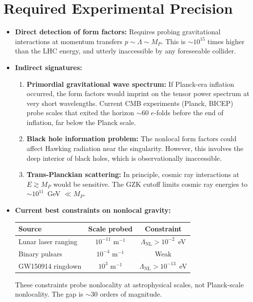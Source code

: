 \documentclass[11pt,a4paper]{article}
\begin{document}
\section{Required Experimental Precision}

\begin{itemize}[leftmargin=2em]
  \item \textbf{Direct detection of form factors:} Requires probing gravitational interactions at momentum transfers $p \sim \Lambda \sim M_P$. This is $\sim 10^{15}$ times higher than the LHC energy, and utterly inaccessible by any foreseeable collider.

  \item \textbf{Indirect signatures:}
    \begin{enumerate}
      \item \textbf{Primordial gravitational wave spectrum:} If Planck-era inflation occurred, the form factors would imprint on the tensor power spectrum at very short wavelengths. Current CMB experiments (Planck, BICEP) probe scales that exited the horizon $\sim 60$ $e$-folds before the end of inflation, far below the Planck scale.
      \item \textbf{Black hole information problem:} The nonlocal form factors could affect Hawking radiation near the singularity. However, this involves the deep interior of black holes, which is observationally inaccessible.
      \item \textbf{Trans-Planckian scattering:} In principle, cosmic ray interactions at $E \gtrsim M_P$ would be sensitive. The GZK cutoff limits cosmic ray energies to $\sim 10^{11}$~GeV $\ll M_P$.
    \end{enumerate}

  \item \textbf{Current best constraints on nonlocal gravity:}
    \begin{center}
    \renewcommand{\arraystretch}{1.2}
    \begin{tabular}{lcc}
      \toprule
      \textbf{Source} & \textbf{Scale probed} & \textbf{Constraint} \\
      \midrule
      Lunar laser ranging & $10^{-11}$ m$^{-1}$ & $\Lambda_{\text{NL}} > 10^{-2}$~eV \\
      Binary pulsars & $10^{-4}$ m$^{-1}$ & Weak \\
      GW150914 ringdown & $10^{3}$ m$^{-1}$ & $\Lambda_{\text{NL}} > 10^{-13}$~eV \\
      \bottomrule
    \end{tabular}
    \end{center}
    These constraints probe nonlocality at astrophysical scales, not Planck-scale nonlocality. The gap is $\sim 30$ orders of magnitude.
\end{itemize}
\end{document}
